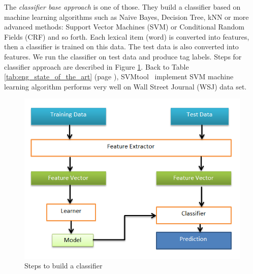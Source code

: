 The \textit{classifier base approach} is one of those. They build a classifier based on machine learning algorithms such as Naive Bayes, Decision Tree, kNN or more advanced methods: Support Vector Machines (SVM) or Conditional Random Fields (CRF) and so forth. Each lexical item (word) is converted into features, then a classifier is  trained on this data. The test data is also converted into features. We run the classifier on test data and produce tag labels. Steps for classifier approach are described in Figure \ref{fig:machineLearning}. Back to Table \ref{tab:eng_state_of_the_art} (page \pageref{tab:eng_state_of_the_art}), SVMtool~\cite{svmtool} implement SVM machine learning algorithm performs very well on Wall Street Journal (WSJ) data set.
\begin{figure}
\centering
\includegraphics[scale=0.6]{Figures/MachineLearning}
\caption{Steps to build a classifier}
\label{fig:machineLearning}
\end{figure}

